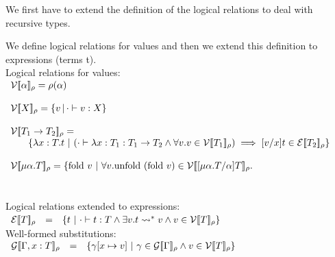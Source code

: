 We first have to extend the definition of the logical relations to deal with recursive types.  
\begin{definition}
  \label{def:logical_relations}
  We define logical relations for values and then we extend this definition to
  expressions (terms t).
  \ \\
  Logical relations for values: \\
  \begin{math}
    \begin{array}{lllll}
      \mathcal{V}\interp{\alpha}_\rho = \rho(\alpha) \\
      & \\
      \mathcal{V}\interp{X}_\rho =  \{ v\,|\,\cdot \vdash v : X \} \\
      & \\
      \mathcal{V}\interp{T_1 \to T_2}_\rho = \\
      \,\,\,\,\,\,\,\,\,\,\,\{ \lambda x:T.t\ |\ 
      (\cdot \vdash \lambda x:T_1 : T_1 \to T_2 \land
      \forall v.v \in \mathcal{V} \interp{T_1}_\rho) \implies [v/x]t \in \mathcal{E}\interp{T_2}_\rho \}\\
      & \\
      \mathcal{V}\interp{\mu \alpha.T}_\rho =  
      \{ \text{fold}\ v\ |\ \forall v.
        \text{unfold}\ (\text{fold}\ v) \in \mathcal{V}\interp{[\mu \alpha.T/\alpha]T}_\rho.\\
    \end{array}
  \end{math}
  \ \\
  \ \\
  Logical relations extended to expressions:\\
  \begin{math}
    \begin{array}{lll}
      \mathcal{E}[\negthinspace[T]\negthinspace]_\rho & = & \{ t\ |\ \cdot \vdash t:T \land 
      \exists v.t \rightsquigarrow^* v \land v \in \mathcal{V}[\negthinspace[T]\negthinspace]_\rho \}
    \end{array}
  \end{math}
  \ \\
  Well-formed substitutions:\\
  \begin{math}
    \begin{array}{lllll}
        \mathcal{G}[\negthinspace[\Gamma,x:T]\negthinspace]_\rho & = & 
        \{ \gamma[x \mapsto v]\ |\ \gamma \in \mathcal{G}[\negthinspace[\Gamma]\negthinspace]_\rho \land 
        v \in \mathcal{V}[\negthinspace[T]\negthinspace]_\rho \}
    \end{array}
  \end{math}
\end{definition}

